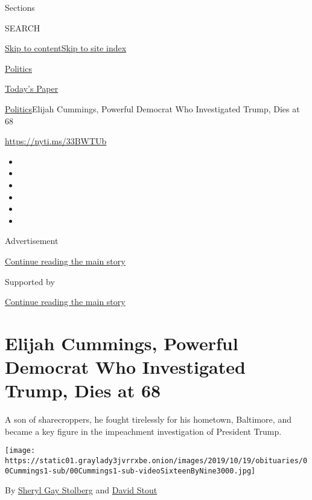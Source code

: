 Sections

SEARCH

\protect\hyperlink{site-content}{Skip to
content}\protect\hyperlink{site-index}{Skip to site index}

\href{https://www.nytimes3xbfgragh.onion/section/politics}{Politics}

\href{https://myaccount.nytimes3xbfgragh.onion/auth/login?response_type=cookie\&client_id=vi}{}

\href{https://www.nytimes3xbfgragh.onion/section/todayspaper}{Today's
Paper}

\href{/section/politics}{Politics}\textbar{}Elijah Cummings, Powerful
Democrat Who Investigated Trump, Dies at 68

\url{https://nyti.ms/33BWTUb}

\begin{itemize}
\item
\item
\item
\item
\item
\item
\end{itemize}

Advertisement

\protect\hyperlink{after-top}{Continue reading the main story}

Supported by

\protect\hyperlink{after-sponsor}{Continue reading the main story}

\hypertarget{elijah-cummings-powerful-democrat-who-investigated-trump-dies-at-68}{%
\section{Elijah Cummings, Powerful Democrat Who Investigated Trump, Dies
at
68}\label{elijah-cummings-powerful-democrat-who-investigated-trump-dies-at-68}}

A son of sharecroppers, he fought tirelessly for his hometown,
Baltimore, and became a key figure in the impeachment investigation of
President Trump.

\texttt{[image: https://static01.graylady3jvrrxbe.onion/images/2019/10/19/obituaries/00Cummings1-sub/00Cummings1-sub-videoSixteenByNine3000.jpg]}

By
\href{https://www.nytimes3xbfgragh.onion/by/sheryl-gay-stolberg}{Sheryl
Gay Stolberg} and
\href{https://www.nytimes3xbfgragh.onion/by/david-stout}{David Stout}

